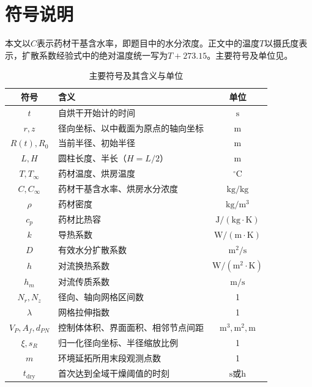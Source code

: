 \section{符号说明}
本文以$C$表示药材干基含水率，即题目中的水分浓度。正文中的温度$T$以摄氏度表示，扩散系数经验式中的绝对温度统一写为$T+273.15$。主要符号及单位见。
\begin{table}[!htbp]\centering\small
\caption{主要符号及其含义与单位}\label{tab:symbols}
\renewcommand{\arraystretch}{1.12}
\begin{tabularx}{0.98\textwidth}{@{}cLc@{}}
\toprule
符号 & 含义 & 单位\\\midrule
$t$ & 自烘干开始计的时间 & $\mathrm{s}$\\
$r,z$ & 径向坐标、以中截面为原点的轴向坐标 & $\mathrm{m}$\\
$R(t),R_0$ & 当前半径、初始半径 & $\mathrm{m}$\\
$L,H$ & 圆柱长度、半长（$H=L/2$） & $\mathrm{m}$\\
$T,T_\infty$ & 药材温度、烘房温度 & $ {}^\circ\mathrm{C}$\\
$C,C_\infty$ & 药材干基含水率、烘房水分浓度 & $\mathrm{kg/kg}$\\
$\rho$ & 药材密度 & $\mathrm{kg/m^3}$\\
$c_p$ & 药材比热容 & $\mathrm{J/(kg\cdot K)}$\\
$k$ & 导热系数 & $\mathrm{W/(m\cdot K)}$\\
$D$ & 有效水分扩散系数 & $\mathrm{m^2/s}$\\
$h$ & 对流换热系数 & $\mathrm{W/(m^2\cdot K)}$\\
$h_m$ & 对流传质系数 & $\mathrm{m/s}$\\
$N_r,N_z$ & 径向、轴向网格区间数 & 1\\
$\lambda$ & 网格拉伸指数 & 1\\
$V_P,A_f,d_{PN}$ & 控制体体积、界面面积、相邻节点间距 & $\mathrm{m^3},\mathrm{m^2},\mathrm{m}$\\
$\xi,s_R$ & 归一化径向坐标、半径缩放比例 & 1\\
$m$ & 环境延拓所用末段观测点数 & 1\\
$t_{\mathrm{dry}}$ & 首次达到全域干燥阈值的时刻 & $\mathrm{s}$或$\mathrm{h}$\\
\bottomrule
\end{tabularx}
\end{table}
